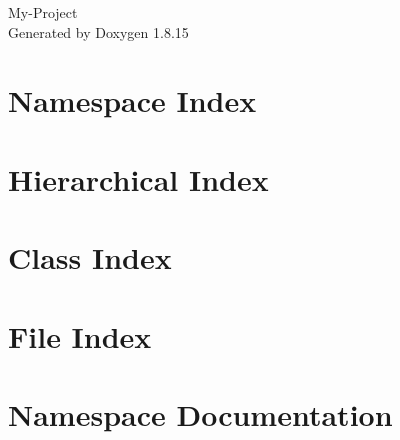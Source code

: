 \let\mypdfximage\pdfximage\def\pdfximage{\immediate\mypdfximage}\documentclass[twoside]{book}
\newcommand{\+}{\discretionary{\mbox{\scriptsize$\hookleftarrow$}}{}{}}
\newcommand{\clearemptydoublepage}{%
  \newpage{\pagestyle{empty}\cleardoublepage}%
}
\begin{document}
\hypersetup{pageanchor=false,
             bookmarksnumbered=true,
             pdfencoding=unicode
            }
\begin{titlepage}
\vspace*{7cm}
\begin{center}%
{\Large My-\/\+Project }\\
\vspace*{1cm}
{\large Generated by Doxygen 1.8.15}\\
\end{center}
\end{titlepage}
\clearemptydoublepage
{}
\tableofcontents
\clearemptydoublepage
{}
\hypersetup{pageanchor=true}

\chapter{Namespace Index}

\chapter{Hierarchical Index}

\chapter{Class Index}

\chapter{File Index}

\chapter{Namespace Documentation}








\end{document}
